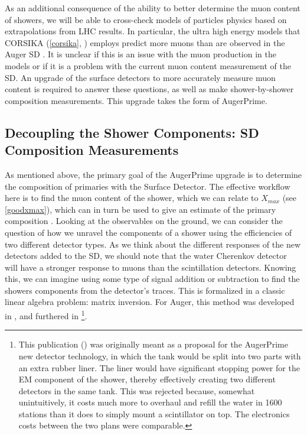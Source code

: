 As an additional consequence of the ability to better determine the muon content of showers, we will be able to cross-check models of particles physics based on extrapolations from LHC results. In particular, the ultra high energy models that CORSIKA (\autoref{corsika}, \cite{corsika}) employs predict more muons than are observed in the Auger SD \cite{mudef}. It is unclear if this is an issue with the muon production in the models or if it is a problem with the current muon content measurement of the SD. An upgrade of the surface detectors to more accurately measure muon content is required to answer these questions, as well as make shower-by-shower composition measurements. This upgrade takes the form of AugerPrime.
\begin{singlespace}
\section{Decoupling the Shower Components: SD Composition Measurements} 
\end{singlespace}
\label{showercomp}
As mentioned above, the primary goal of the AugerPrime upgrade is to determine the composition of primaries with the Surface Detector. The effective workflow here is to find the muon content of the shower, which we can relate to $X_{max}$ (see \autoref{goodxmax}), which can in turn be used to give an estimate of the primary composition \cite{primeuniv, toprime, primepdr,xmaxcomp}. Looking at the observables on the ground, we can consider the question of how we unravel the components of a shower using the efficiencies of two different detector types. As we think about the different responses of the new detectors added to the SD, we should note that the water Cherenkov detector will have a stronger response to muons than the scintillation detectors. Knowing this, we can imagine using some type of signal addition or subtraction to find the showers components from the detector's traces. This is formalized in a classic linear algebra problem: matrix inversion. For Auger, this method was developed in , and furthered in \footnote{This publication (\cite{matinv}) was originally meant as a proposal for the AugerPrime new detector technology, in which the tank would be split into two parts with an extra rubber liner. The liner would have significant stopping power for the EM component of the shower, thereby effectively creating two different detectors in the same tank. This was rejected because, somewhat unintuitively, it costs much more to overhaul and refill the water in 1600 stations than it does to simply mount a scintillator on top. The electronics costs between the two plans were comparable.}.

